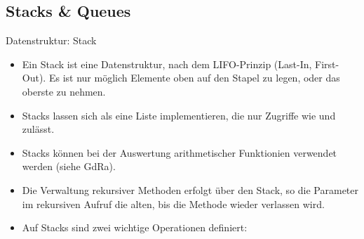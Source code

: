 
\subsection{Stacks \& Queues}

\begin{frame}{Datenstruktur: Stack}
    \hypertarget<1>{mrk:Stack}{}%
    \begin{itemize}[<+(1)->]
        \item Ein Stack ist eine Datenstruktur, nach dem LIFO-Prinzip (Last-In, First-Out).\pause{} Es ist nur möglich Elemente oben auf den Stapel zu legen, oder das oberste zu nehmen.
        \item Stacks lassen sich als eine Liste implementieren,\pause{} die nur Zugriffe wie  und  zulässt.
        \item Stacks können bei der Auswertung arithmetischer Funktionien verwendet werden (siehe GdRa).
        \item Die Verwaltung rekursiver Methoden erfolgt über den Stack, so  die Parameter im rekursiven Aufruf die alten, bis die Methode wieder verlassen wird.
        \item Auf Stacks sind zwei wichtige Operationen definiert: 
    \end{itemize}
\end{frame}

